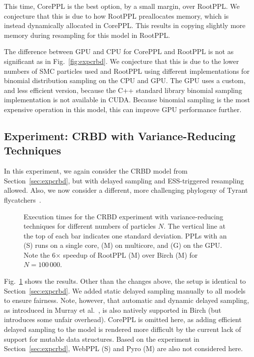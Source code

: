 \documentclass[runningheads]{llncs}
\begin{document}
This time, CorePPL is the best option, by a small margin, over RootPPL.
We conjecture that this is due to how RootPPL preallocates memory, which is instead dynamically allocated in CorePPL.
This results in copying slightly more memory during resampling for this model in RootPPL.

The difference between GPU and CPU for CorePPL and RootPPL is not as significant as in Fig.~\ref{fig:expcrbd}.
We conjecture that this is due to the lower numbers of SMC particles used and RootPPL using different implementations for binomial distribution sampling on the CPU and GPU.
The GPU uses a custom, and less efficient version, because the C++ standard library binomial sampling implementation is not available in CUDA.
Because binomial sampling is the most expensive operation in this model, this can improve GPU performance further.

\subsection{Experiment: CRBD with Variance-Reducing Techniques}\label{sec:expocrbd}
In this experiment, we again consider the CRBD model from Section~\ref{sec:expcrbd}, but with delayed sampling and ESS-triggered resampling allowed.
Also, we now consider a different, more challenging phylogeny of Tyrant flycatchers~\cite{ronquist2021universal,jetz2012global}.

\begin{figure}[tb]
  \resizebox{\textwidth}{!}{}
  \caption{Execution times for the CRBD experiment with variance-reducing techniques for different numbers of particles $N$. The vertical line at the top of each bar indicates one standard deviation. PPLs with an (S) runs on a single core, (M) on multicore, and (G) on the GPU. Note the 6$\times$ speedup of RootPPL (M) over Birch (M) for $N = 100\,000$.}
  \label{fig:expoptcrbd}
\end{figure}
Fig.~\ref{fig:expoptcrbd} shows the results.
Other than the changes above, the setup is identical to Section~\ref{sec:expcrbd}.
We added static delayed sampling manually to all models to ensure fairness.
Note, however, that automatic and dynamic delayed sampling, as introduced in Murray et al.~\cite{murray2018delayed}, is also natively supported in Birch (but introduces some unfair overhead).
CorePPL is omitted here, as adding efficient delayed sampling to the model is rendered more
difficult by the current lack of support for mutable data structures.
Based on the experiment in Section~\ref{sec:expcrbd}, WebPPL (S) and Pyro (M) are also not considered here.
\end{document}
